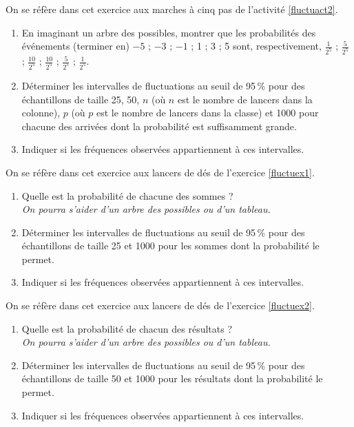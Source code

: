 \begin{exo}
 On se r\'ef\`ere dans cet exercice aux marches \`a cinq pas de l'activit\'e \ref{fluctuact2}.
 \begin{enumerate}
  \item En imaginant un arbre des possibles, montrer que les probabilit\'es des \'ev\'enements (terminer en) $-5$ ; $-3$ ; $-1$ ; 1 ; 3 ; 5 sont, respectivement, $\frac{1}{2^5}$ ; $\frac{5}{2^5}$ ; $\frac{10}{2^5}$ ; $\frac{10}{2^5}$ ; $\frac{5}{2^5}$ ; $\frac{1}{2^5}$.
  \item D\'eterminer les intervalles de fluctuations au seuil de 95\,\% pour des \'echantillons de taille 25, 50, $n$ (o\`u $n$ est le nombre de lancers dans la colonne), $p$ (o\`u $p$ est le nombre de lancers dans la classe) et 1000 pour chacune des arriv\'ees dont la probabilit\'e est suffisamment grande.
  \item Indiquer si les fr\'equences observ\'ees appartiennent \`a ces intervalles.
 \end{enumerate}

\end{exo}

\begin{exo}
 On se r\'ef\`ere dans cet exercice aux lancers de d\'es de l'exercice \ref{fluctuex1}.
 \begin{enumerate}
  \item Quelle est la probabilit\'e de chacune des sommes ?\\
  \emph{On pourra s'aider d'un arbre des possibles ou d'un tableau.}
  \item D\'eterminer les intervalles de fluctuations au seuil de 95\,\% pour des \'echantillons de taille 25 et 1000 pour les sommes dont la probabilit\'e le permet.
  \item Indiquer si les fr\'equences observ\'ees appartiennent \`a ces intervalles.
 \end{enumerate}

\end{exo}

\begin{exo}
 On se r\'ef\`ere dans cet exercice aux lancers de d\'es de l'exercice \ref{fluctuex2}.
 \begin{enumerate}
  \item Quelle est la probabilit\'e de chacun des r\'esultats ?\\
  \emph{On pourra s'aider d'un arbre des possibles ou d'un tableau.}
  \item D\'eterminer les intervalles de fluctuations au seuil de 95\,\% pour des \'echantillons de taille 50 et 1000 pour les r\'esultats dont la probabilit\'e le permet.
  \item Indiquer si les fr\'equences observ\'ees appartiennent \`a ces intervalles.
 \end{enumerate}

\end{exo}

